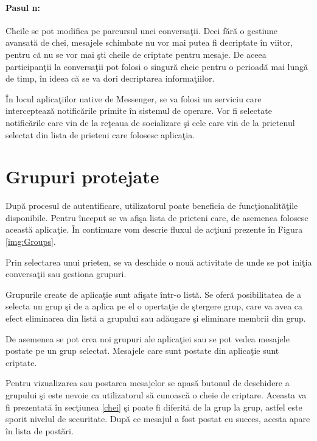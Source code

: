\paragraph{Pasul n:}

Cheile se pot modifica pe parcursul unei conversa\c{t}ii. Deci f\u{a}r\u{a} o gestiune avansat\u{a} de chei, mesajele schimbate nu vor mai putea fi decriptate \^{i}n viitor, pentru c\u{a} nu se vor mai \c{s}ti cheile de criptate pentru mesaje. De aceea participan\c{t}ii la conversa\c{t}ii pot folosi o singur\u{a} cheie pentru o perioad\u{a} mai lung\u{a} de timp, \^{i}n ideea c\u{a} se va dori decriptarea informa\c{t}iilor.

\^{I}n locul aplica\c{t}iilor native de Messenger, se va folosi un serviciu care intercepteaz\u{a} notific\u{a}rile primite \^{i}n sistemul de operare. Vor fi selectate notific\u{a}rile care vin de la re\c{t}eaua de socializare \c{s}i cele care vin de la prietenul selectat din lista de prieteni care folosesc aplica\c{t}ia.

\section{Grupuri protejate}

Dup\u{a} procesul de autentificare, utilizatorul poate beneficia de func\c{t}ionalit\u{a}\c{t}ile disponibile. Pentru \^{i}nceput se va afi\c{s}a lista de prieteni care, de asemenea folosesc aceast\u{a} aplica\c{t}ie. \^{I}n continuare vom descrie fluxul de ac\c{t}iuni prezente \^{i}n Figura \ref{img:Groups}.


Prin selectarea unui prieten, se va deschide o nou\u{a} activitate de unde se pot ini\c{t}ia conversa\c{t}ii sau gestiona grupuri.

Grupurile create de aplica\c{t}ie sunt afi\c{s}ate \^{i}ntr-o list\u{a}. Se ofer\u{a} posibilitatea de a selecta un grup \c{s}i de a aplica pe el o operta\c{t}ie de \c{s}tergere grup, care va avea ca efect eliminarea din list\u{a} a grupului sau ad\u{a}ugare \c{s}i eliminare membrii din grup.

De asemenea se pot crea noi grupuri ale aplica\c{t}iei sau se pot vedea mesajele postate pe un grup selectat. Mesajele care sunt postate din aplica\c{t}ie sunt criptate.

Pentru vizualizarea sau postarea mesajelor se apas\u{a} butonul de deschidere a grupului \c{s}i este nevoie ca utilizatorul s\u{a} cunoasc\u{a} o cheie de criptare. Aceasta va fi prezentat\u{a} \^{i}n sec\c{t}iunea \ref{chei} \c{s}i poate fi diferit\u{a} de la grup la grup, astfel este sporit nivelul de securitate. Dup\u{a} ce mesajul a fost postat cu succes, acesta apare \^{i}n lista de post\u{a}ri.

